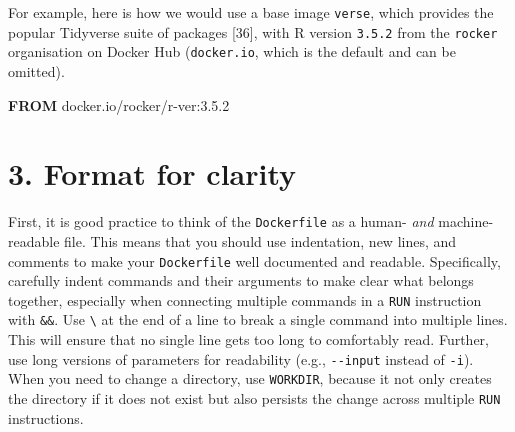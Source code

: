 \documentclass[10pt,letterpaper]{article}
\newenvironment{Shaded}{\begin{snugshade}}{\end{snugshade}}
\newcommand{\KeywordTok}[1]{\textcolor[rgb]{0.13,0.29,0.53}{\textbf{#1}}}
\newcommand{\NormalTok}[1]{#1}
\begin{document}
For example, here is how we would use a base image \texttt{verse}, which
provides the popular Tidyverse suite of packages {[}36{]}, with R
version \texttt{3.5.2} from the \texttt{rocker} organisation on Docker
Hub (\texttt{docker.io}, which is the default and can be omitted).

\footnotesize

\begin{Shaded}
\begin{Highlighting}[]
\KeywordTok{FROM}\NormalTok{ docker.io/rocker/r-ver:3.5.2}
\end{Highlighting}
\end{Shaded}

\normalsize

\hypertarget{format-for-clarity}{%
\section{3. Format for clarity}\label{format-for-clarity}}

  \label{rule:formatting} 
  \label{rule:clarity} 

First, it is good practice to think of the \texttt{Dockerfile} as a
human- \emph{and} machine-readable file. This means that you should use
indentation, new lines, and comments to make your \texttt{Dockerfile}
well documented and readable. Specifically, carefully indent commands
and their arguments to make clear what belongs together, especially when
connecting multiple commands in a \texttt{RUN} instruction with
\texttt{\&\&}. Use \texttt{\textbackslash{}} at the end of a line to
break a single command into multiple lines. This will ensure that no
single line gets too long to comfortably read. Further, use long
versions of parameters for readability (e.g., \texttt{-\/-input} instead
of \texttt{-i}). When you need to change a directory, use
\texttt{WORKDIR}, because it not only creates the directory if it does
not exist but also persists the change across multiple \texttt{RUN}
instructions.
\end{document}
